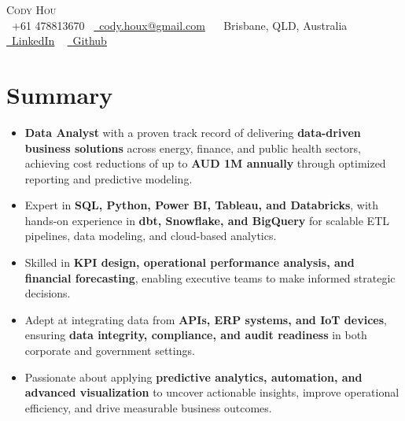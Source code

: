 \documentclass[letterpaper,11pt]{article}
\begin{document}
\begin{center}
  {\Huge \scshape Cody Hou} \\ \vspace{5pt}
  \small \raisebox{-0.1\height}\faPhone\ +61 478813670~ 
  \href{mailto:ce.hou.data@gmail.com}{\raisebox{-0.2\height}\faEnvelope\  \underline{cody.houx@gmail.com}} ~
  \faMapMarker\ Brisbane, QLD, Australia ~
  \href{https://www.linkedin.com/in/ce-hou}{\raisebox{-0.2\height}\faLinkedin\ \underline{LinkedIn}}  ~
  \href{https://github.com/DataCody}{\raisebox{-0.2\height}\faGithub\ \underline{Github}}
  \vspace{-8pt}
\end{center}


\section{Summary}
\begin{itemize}[leftmargin=0.15in, label={•}]
\setlength{\itemsep}{-3pt}
    \item \textbf{Data Analyst} with a proven track record of delivering \textbf{data-driven business solutions} across energy, finance, and public health sectors, achieving cost reductions of up to \textbf{AUD 1M annually} through optimized reporting and predictive modeling.
    \item Expert in \textbf{SQL, Python, Power BI, Tableau, and Databricks}, with hands-on experience in \textbf{dbt, Snowflake, and BigQuery} for scalable ETL pipelines, data modeling, and cloud-based analytics.
    \item Skilled in \textbf{KPI design, operational performance analysis, and financial forecasting}, enabling executive teams to make informed strategic decisions.
    \item Adept at integrating data from \textbf{APIs, ERP systems, and IoT devices}, ensuring \textbf{data integrity, compliance, and audit readiness} in both corporate and government settings.
    \item Passionate about applying \textbf{predictive analytics, automation, and advanced visualization} to uncover actionable insights, improve operational efficiency, and drive measurable business outcomes.
\end{itemize}
\vspace{-15pt}

\end{document}
